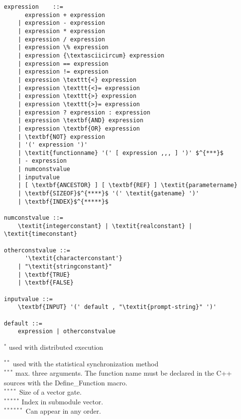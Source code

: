 \begin{Verbatim}[commandchars=\\\{\}]
expression    ::=
      expression + expression
    | expression - expression
    | expression * expression
    | expression / expression
    | expression \% expression
    | expression {\textasciicircum} expression
    | expression == expression
    | expression != expression
    | expression \texttt{<} expression
    | expression \texttt{<}= expression
    | expression \texttt{>} expression
    | expression \texttt{>}= expression
    | expression ? expression : expression
    | expression \textbf{AND} expression
    | expression \textbf{OR} expression
    | \textbf{NOT} expression
    | '(' expression ')'
    | \textit{functionname} '(' [ expression ,,, ] ')' $^{***}$
    | - expression
    | numconstvalue
    | inputvalue
    | [ \textbf{ANCESTOR} ] [ \textbf{REF} ] \textit{parametername}
    | \textbf{SIZEOF}$^{****}$ '(' \textit{gatename} ')'
    | \textbf{INDEX}$^{*****}$

numconstvalue ::=
    \textit{integerconstant} | \textit{realconstant} | \textit{timeconstant}

otherconstvalue ::=
      '\textit{characterconstant'}
    | "\textit{stringconstant}"
    | \textbf{TRUE}
    | \textbf{FALSE}

inputvalue ::=
    \textbf{INPUT} '(' default , "\textit{prompt-string}" ')'

default ::=
    expression | otherconstvalue
\end{Verbatim}


$^{*}$ used with distributed execution


$^{**}$ used with the statistical synchronization method\\
$^{***}$ max. three arguments. The function name must be declared
in the C++ sources with the Define\_Function macro.\\
$^{****}$ Size of a vector gate.\\
$^{*****}$ Index in submodule vector.\\
$^{******}$ Can appear in any order.



